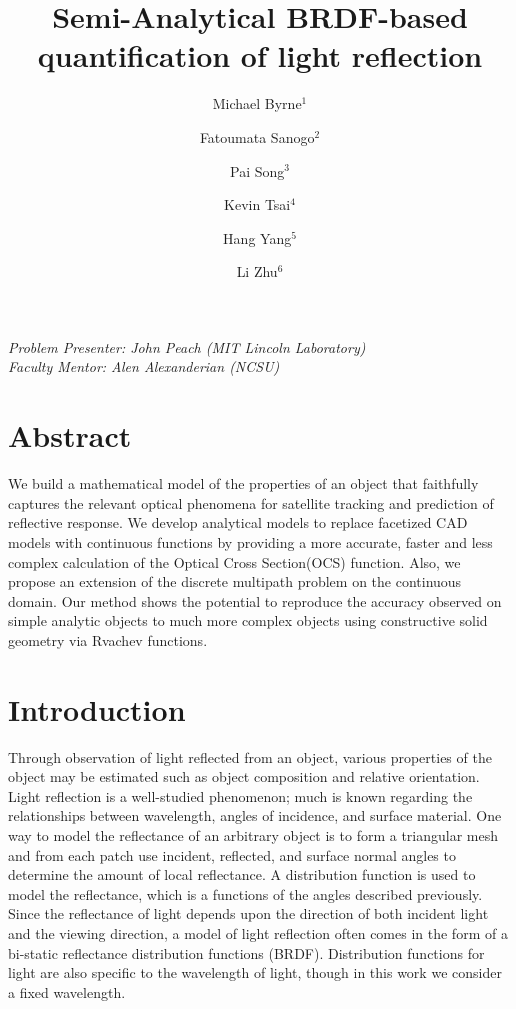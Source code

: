 \documentclass[11pt,reqno]{amsart}
\author{Michael Byrne$^1$}
\author{Fatoumata Sanogo$^2$}
\author{Pai Song$^3$}
\author{Kevin Tsai$^4$}
\author{Hang Yang$^5$}
\author{Li Zhu$^6$}
\title{Semi-Analytical BRDF-based quantification of light reflection}
\theoremstyle{definition}
\begin{document}
\maketitle
{\noindent
\textit{Problem Presenter:  John Peach (MIT Lincoln Laboratory)\\
Faculty Mentor: Alen Alexanderian (NCSU)}}

\tableofcontents

\section{Abstract}

We build a mathematical model of the properties of an object that faithfully
captures the relevant optical phenomena for satellite tracking and prediction
of reflective response. We develop analytical models to replace facetized CAD
models with continuous functions by providing a more accurate, faster and less
complex calculation of the Optical Cross Section(OCS) function. Also, we
propose an extension of the discrete multipath problem on the continuous
domain. Our method shows the potential to reproduce the accuracy observed on
simple analytic objects to much more complex objects using constructive solid
geometry via Rvachev functions.

\section{Introduction}
Through observation of light reflected from an object, various properties of the object may be estimated such as object composition and relative orientation. 
Light reflection is a well-studied phenomenon; much is known regarding the relationships between wavelength, angles of incidence, and surface material. 
One way to model the reflectance of an arbitrary object is to form a triangular mesh and from each patch use incident, reflected, and surface normal angles to determine the amount of local reflectance. 
A distribution function is used to model the reflectance, which is a  functions of the angles described previously. 
Since the reflectance of light depends upon the direction of both incident light and the viewing direction, a model of light reflection often comes in the form of a bi-static reflectance distribution functions (BRDF). 
Distribution functions for light are also specific to the wavelength of light, though in this 
work we consider a fixed wavelength. 
\end{document}
